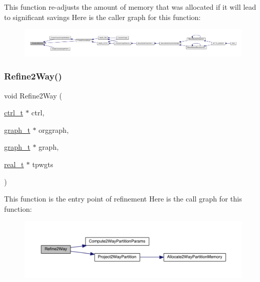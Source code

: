 This function re-\/adjusts the amount of memory that was allocated if it will lead to significant savings Here is the caller graph for this function\+:\nopagebreak
\begin{figure}[H]
\begin{center}
\leavevmode
\includegraphics[width=350pt]{a00945_ab69ab96ec78174da232dff05e9c79d2f_icgraph}
\end{center}
\end{figure}
\mbox{\label{a00945_a03a77c5e7614ed4058d347bd975fb3bd}} 
\subsubsection{\texorpdfstring{Refine2\+Way()}{Refine2Way()}}
{\footnotesize\ttfamily void Refine2\+Way (\begin{DoxyParamCaption}\item[{\hyperlink{a00742}{ctrl\+\_\+t} $\ast$}]{ctrl,  }\item[{\hyperlink{a00734}{graph\+\_\+t} $\ast$}]{orggraph,  }\item[{\hyperlink{a00734}{graph\+\_\+t} $\ast$}]{graph,  }\item[{\hyperlink{a00876_a1924a4f6907cc3833213aba1f07fcbe9}{real\+\_\+t} $\ast$}]{tpwgts }\end{DoxyParamCaption})}

This function is the entry point of refinement Here is the call graph for this function\+:\nopagebreak
\begin{figure}[H]
\begin{center}
\leavevmode
\includegraphics[width=350pt]{a00945_a03a77c5e7614ed4058d347bd975fb3bd_cgraph}
\end{center}
\end{figure}
\mbox{\label{a00945_a2fd4bd5f789c1c1248aa326d0cac9023}} 
